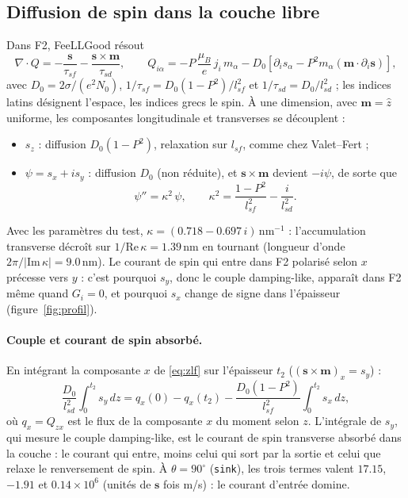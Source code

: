 \documentclass[11pt,a4paper]{article}
\newcommand{\vm}{\bm{m}}
\newcommand{\vs}{\bm{s}}
\begin{document}
\subsection{Diffusion de spin dans la couche libre}

Dans F2, FeeLLGood résout
\begin{equation}
  \nabla\cdot Q = -\frac{\vs}{\tau_{sf}} - \frac{\vs\times\vm}{\tau_{sd}},
  \qquad
  Q_{i\alpha} = -P\,\frac{\mu_B}{e}\,j_i\,m_\alpha
  - D_0\left[\partial_i s_\alpha - P^2 m_\alpha(\vm\cdot\partial_i\vs)\right],
  \label{eq:zlf}
\end{equation}
avec $D_0 = 2\sigma/(e^2N_0)$, $1/\tau_{sf} = D_0(1-P^2)/l_{sf}^2$ et
$1/\tau_{sd} = D_0/l_{sd}^2$ ; les indices latins désignent l'espace, les
indices grecs le spin. À une dimension, avec $\vm = \hat z$ uniforme, les
composantes longitudinale et transverses se découplent :
\begin{itemize}
  \item $s_z$ : diffusion $D_0(1-P^2)$, relaxation sur $l_{sf}$, comme
    chez Valet--Fert ;
  \item $\psi = s_x + i s_y$ : diffusion $D_0$ (non réduite), et
    $\vs\times\vm$ devient $-i\psi$, de sorte que
    \begin{equation}
      \psi'' = \kappa^2\,\psi,
      \qquad
      \kappa^2 = \frac{1-P^2}{l_{sf}^2} - \frac{i}{l_{sd}^2} .
    \end{equation}
\end{itemize}
Avec les paramètres du test, $\kappa = (0.718 - 0.697\,i)$\,nm$^{-1}$ :
l'accumulation transverse décroît sur $1/\mathrm{Re}\,\kappa = 1.39$\,nm en
tournant (longueur d'onde $2\pi/|\mathrm{Im}\,\kappa| = 9.0$\,nm). Le
courant de spin qui entre dans F2 polarisé selon $x$ précesse vers $y$ :
c'est pourquoi $s_y$, donc le couple damping-like, apparaît dans F2 même
quand $G_i = 0$, et pourquoi $s_x$ change de signe dans l'épaisseur
(figure~\ref{fig:profil}).

\paragraph{Couple et courant de spin absorbé.} En intégrant la composante
$x$ de \eqref{eq:zlf} sur l'épaisseur $t_2$ ($(\vs\times\vm)_x = s_y$) :
\begin{equation}
  \frac{D_0}{l_{sd}^2}\int_0^{t_2} s_y\,dz
  = q_x(0) - q_x(t_2) - \frac{D_0(1-P^2)}{l_{sf}^2}\int_0^{t_2}s_x\,dz ,
\end{equation}
où $q_x = Q_{zx}$ est le flux de la composante $x$ du moment selon $z$.
L'intégrale de $s_y$, qui mesure le couple damping-like, est le courant de
spin transverse absorbé dans la couche : le courant qui entre, moins celui
qui sort par la sortie et celui que relaxe le renversement de spin. À
$\theta = 90^\circ$ (\texttt{sink}), les trois termes valent $17.15$,
$-1.91$ et $0.14\times10^6$ (unités de $\vs$ fois m/s) : le courant
d'entrée domine.
\end{document}
